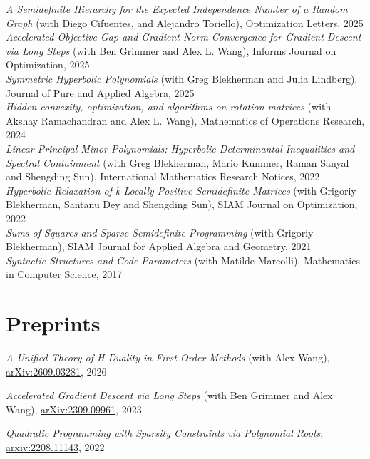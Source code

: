 \documentclass[margin]{res}
\begin{document}
\begin{resume}
\emph{A Semidefinite Hierarchy for the Expected Independence Number of a Random Graph} (with Diego Cifuentes, and Alejandro Toriello), Optimization Letters, 2025\\

\emph{Accelerated Objective Gap and Gradient Norm Convergence for Gradient Descent via Long Steps} (with Ben Grimmer and Alex L. Wang), Informs Journal on Optimization, 2025\\

\emph{Symmetric Hyperbolic Polynomials} (with Greg Blekherman and Julia Lindberg), Journal of Pure and Applied Algebra, 2025\\

\emph{Hidden convexity, optimization, and algorithms on rotation matrices  } (with Akshay Ramachandran and Alex L. Wang), Mathematics of Operations Research, 2024\\

\emph{Linear Principal Minor Polynomials: Hyperbolic Determinantal Inequalities and Spectral Containment } (with Greg Blekherman, Mario Kummer, Raman Sanyal and Shengding Sun), International Mathematics Research Notices, 2022\\

\emph{Hyperbolic Relaxation of k-Locally Positive Semidefinite Matrices} (with Grigoriy Blekherman, Santanu Dey and Shengding Sun), SIAM Journal on Optimization, 2022\\

\emph{Sums of Squares and Sparse Semidefinite Programming} (with Grigoriy Blekherman),
SIAM Journal for Applied Algebra and Geometry, 2021
\\

\emph{Syntactic Structures and Code Parameters} (with Matilde Marcolli), Mathematics in Computer Science, 2017\\

\section{Preprints}
\emph{ A Unified Theory of H-Duality in First-Order Methods } (with Alex Wang), \href{https://arxiv.org/abs/2609.03281}{arXiv:2609.03281}, 2026

\emph{Accelerated Gradient Descent via Long Steps} (with Ben Grimmer and Alex Wang), \href{https://arxiv.org/abs/2309.09961}{arXiv:2309.09961}, 2023

\emph{Quadratic Programming with Sparsity Constraints via Polynomial Roots}, 
\href{https://arxiv.org/abs/2208.11143}{arxiv:2208.11143}, 2022


\end{resume}
\end{document}
